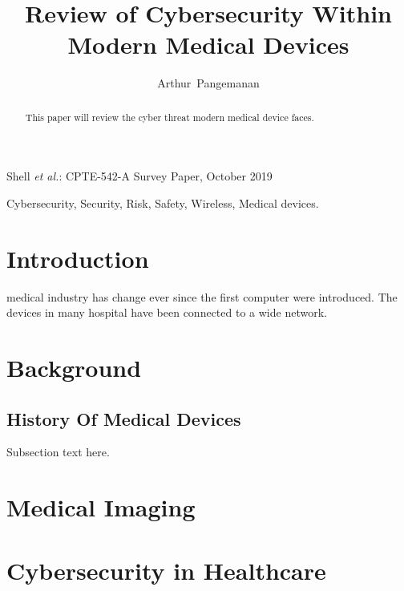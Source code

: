 \documentclass{IEEEtran}
\begin{document}
%
\title{Review of Cybersecurity Within Modern Medical Devices}


\author{Arthur~Pangemanan}%



%
{Shell \MakeLowercase{\textit{et al.}}: CPTE-542-A Survey Paper, October 2019}

\maketitle

\begin{abstract}
	
	
	This paper will review the cyber threat modern medical device faces.
\end{abstract}

\begin{IEEEkeywords}
Cybersecurity, Security, Risk, Safety, Wireless, Medical devices.
\end{IEEEkeywords}


\section{Introduction}
 medical industry has change ever since the first computer were introduced. The devices in many hospital have been connected to a wide network.

\section{Background}
\subsection{History Of Medical Devices}
Subsection text here.


\section{Medical Imaging}

\section{Cybersecurity in Healthcare}
\end{document}
